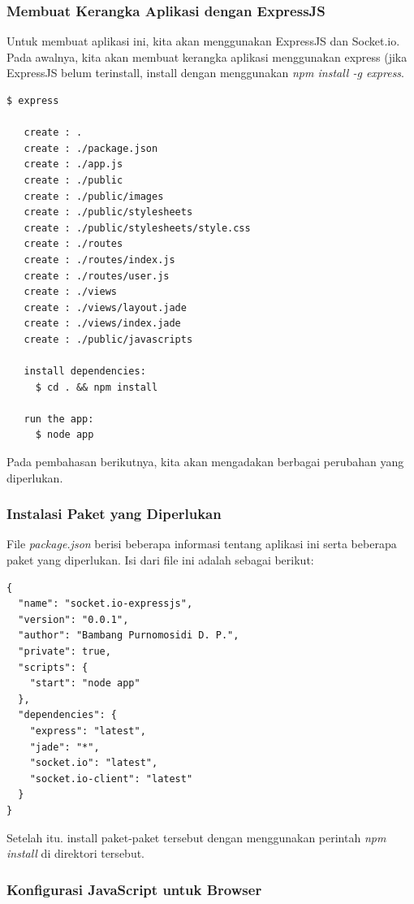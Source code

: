 \subsubsection{Membuat Kerangka Aplikasi dengan ExpressJS}

Untuk membuat aplikasi ini, kita akan menggunakan ExpressJS dan Socket.io. Pada awalnya, kita akan membuat kerangka aplikasi menggunakan express (jika ExpressJS belum terinstall, install dengan menggunakan \textit{npm install -g express}. 

\lstset{language=Bash,caption=Membuat kerangka aplikasi dengan ExpressJS}
\begin{lstlisting}
$ express 

   create : .
   create : ./package.json
   create : ./app.js
   create : ./public
   create : ./public/images
   create : ./public/stylesheets
   create : ./public/stylesheets/style.css
   create : ./routes
   create : ./routes/index.js
   create : ./routes/user.js
   create : ./views
   create : ./views/layout.jade
   create : ./views/index.jade
   create : ./public/javascripts

   install dependencies:
     $ cd . && npm install

   run the app:
     $ node app
\end{lstlisting}

Pada pembahasan berikutnya, kita akan mengadakan berbagai perubahan yang diperlukan.

\subsubsection{Instalasi Paket yang Diperlukan}

File \textit{package.json} berisi beberapa informasi tentang aplikasi ini serta beberapa paket yang diperlukan. Isi dari file ini adalah sebagai berikut:

\lstset{language=JavaScript,caption=package.json}
\begin{lstlisting}
{
  "name": "socket.io-expressjs",
  "version": "0.0.1",
  "author": "Bambang Purnomosidi D. P.",
  "private": true,
  "scripts": {
    "start": "node app"
  },
  "dependencies": {
    "express": "latest",
    "jade": "*",
    "socket.io": "latest",
    "socket.io-client": "latest"
  }
}
\end{lstlisting}

Setelah itu. install paket-paket tersebut dengan menggunakan perintah \textit{npm install} di direktori tersebut. 

\subsubsection{Konfigurasi JavaScript untuk Browser}

